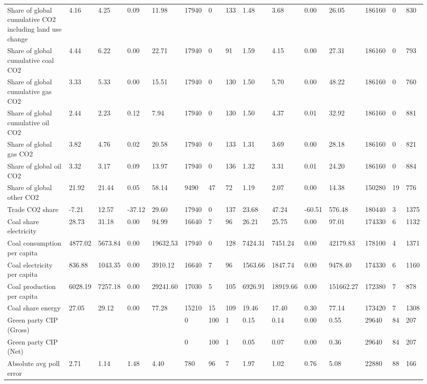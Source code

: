 \begin{longtable}{lllllllllllllll}
Share of global cumulative CO2 including land use change & 4.16 & 4.25 & 0.09 & 11.98 & 17940 & 0 & 133 & 1.48 & 3.68 & 0.00 & 26.05 & 186160 & 0 & 830\\
Share of global cumulative coal CO2 & 4.44 & 6.22 & 0.00 & 22.71 & 17940 & 0 & 91 & 1.59 & 4.15 & 0.00 & 27.31 & 186160 & 0 & 793\\
Share of global cumulative gas CO2 & 3.33 & 5.33 & 0.00 & 15.51 & 17940 & 0 & 130 & 1.50 & 5.70 & 0.00 & 48.22 & 186160 & 0 & 760\\
\addlinespace
Share of global cumulative oil CO2 & 2.44 & 2.23 & 0.12 & 7.94 & 17940 & 0 & 130 & 1.50 & 4.37 & 0.01 & 32.92 & 186160 & 0 & 881\\
Share of global gas CO2 & 3.82 & 4.76 & 0.02 & 20.58 & 17940 & 0 & 133 & 1.31 & 3.69 & 0.00 & 28.18 & 186160 & 0 & 821\\
Share of global oil CO2 & 3.32 & 3.17 & 0.09 & 13.97 & 17940 & 0 & 136 & 1.32 & 3.31 & 0.01 & 24.20 & 186160 & 0 & 884\\
Share of global other CO2 & 21.92 & 21.44 & 0.05 & 58.14 & 9490 & 47 & 72 & 1.19 & 2.07 & 0.00 & 14.38 & 150280 & 19 & 776\\
Trade CO2 share & -7.21 & 12.57 & -37.12 & 29.60 & 17940 & 0 & 137 & 23.68 & 47.24 & -60.51 & 576.48 & 180440 & 3 & 1375\\
\addlinespace
Coal share electricity & 28.73 & 31.18 & 0.00 & 94.99 & 16640 & 7 & 96 & 26.21 & 25.75 & 0.00 & 97.01 & 174330 & 6 & 1132\\
Coal consumption per capita & 4877.02 & 5673.84 & 0.00 & 19632.53 & 17940 & 0 & 128 & 7424.31 & 7451.24 & 0.00 & 42179.83 & 178100 & 4 & 1371\\
Coal electricity per capita & 836.88 & 1043.35 & 0.00 & 3910.12 & 16640 & 7 & 96 & 1563.66 & 1847.74 & 0.00 & 9478.40 & 174330 & 6 & 1160\\
Coal production per capita & 6028.19 & 7257.18 & 0.00 & 29241.60 & 17030 & 5 & 105 & 6926.91 & 18919.66 & 0.00 & 151662.27 & 172380 & 7 & 878\\
Coal share energy & 27.05 & 29.12 & 0.00 & 77.28 & 15210 & 15 & 109 & 19.46 & 17.40 & 0.30 & 77.14 & 173420 & 7 & 1308\\
\addlinespace
Green party CIP (Gross) &  &  &  &  & 0 & 100 & 1 & 0.15 & 0.14 & 0.00 & 0.55 & 29640 & 84 & 207\\
Green party CIP (Net) &  &  &  &  & 0 & 100 & 1 & 0.05 & 0.07 & 0.00 & 0.36 & 29640 & 84 & 207\\
Absolute avg poll error & 2.71 & 1.14 & 1.48 & 4.40 & 780 & 96 & 7 & 1.97 & 1.02 & 0.76 & 5.08 & 22880 & 88 & 166\\

\end{longtable}
